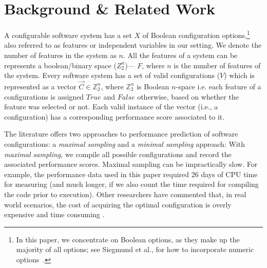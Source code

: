 \documentclass{newsig}
\begin{document}


\section{Background \& Related Work}  
\label{sect:addit}

A configurable software system has a set $X$ of Boolean configuration options,\footnote{In this paper, we concentrate on Boolean options, as they make up the majority of all options; see Siegmund et al., for how to incorporate numeric options~\cite{SGA+15}.} also referred to as features or independent variables in our setting. We denote the number of features in the system as $n$. All the features of a system can be represents a boolean/binary space (${Z}_{2}^{n}$)--- $F$, where $n$ is the number of features of the system. Every software system has a set of valid configurations ($V$) which is represented as a vector $\vec{C} \in \mathbb{Z}_{2}^{n}$, where $\mathbb{Z}_{2}^{n}$
is Boolean $n$-space i.e. each feature of a configurations is assigned $\mathit{True}$ and $\mathit{False}$ otherwise, based on whether the feature was selected or not.  Each valid instance of the vector (i.e., a configuration) has a corresponding performance score associated to it. 

The literature offers two approaches to performance prediction of software configurations: a {\em maximal sampling} and a {\em minimal sampling} approach: 
With {\em maximal sampling}, we compile all  possible configurations and record the associated performance scores. 
Maximal sampling  can be impractically slow. For example, the performance data used in this paper required  26 days of CPU time for measuring (and much longer, if we also count the time required for compiling the code prior to execution). 
 Other researchers have commented that,  in 
 real world scenarios, the cost of acquiring the optimal configuration is overly expensive and time consuming \cite{weiss2008maximizing}.
 
\end{document}

